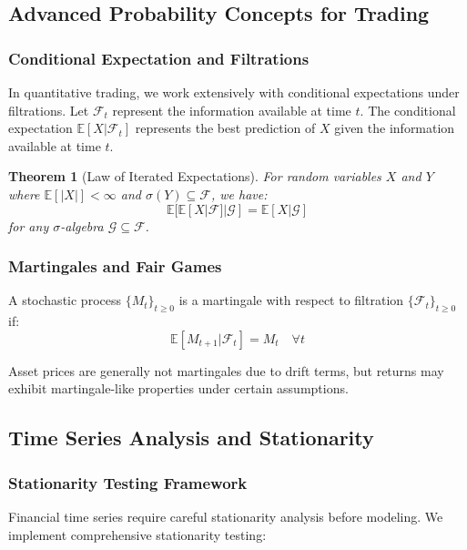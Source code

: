 \documentclass[11pt,letterpaper,openany]{book}
\newtheorem{theorem}{Theorem}[chapter]
\begin{document}
\subsection{Advanced Probability Concepts for Trading}

\subsubsection{Conditional Expectation and Filtrations}

In quantitative trading, we work extensively with conditional expectations under filtrations. Let $\mathcal{F}_t$ represent the information available at time $t$. The conditional expectation $\mathbb{E}[X|\mathcal{F}_t]$ represents the best prediction of $X$ given the information available at time $t$.

\begin{theorem}[Law of Iterated Expectations]
For random variables $X$ and $Y$ where $\mathbb{E}[|X|] < \infty$ and $\sigma(Y) \subseteq \mathcal{F}$, we have:
\[
\mathbb{E}[\mathbb{E}[X|\mathcal{F}] | \mathcal{G}] = \mathbb{E}[X | \mathcal{G}]
\]
for any $\sigma$-algebra $\mathcal{G} \subseteq \mathcal{F}$.
\end{theorem}

\subsubsection{Martingales and Fair Games}

A stochastic process $\{M_t\}_{t \geq 0}$ is a martingale with respect to filtration $\{\mathcal{F}_t\}_{t \geq 0}$ if:
\[
\mathbb{E}[M_{t+1} | \mathcal{F}_t] = M_t \quad \forall t
\]

Asset prices are generally not martingales due to drift terms, but returns may exhibit martingale-like properties under certain assumptions.

\subsection{Time Series Analysis and Stationarity}

\subsubsection{Stationarity Testing Framework}

Financial time series require careful stationarity analysis before modeling. We implement comprehensive stationarity testing:
\end{document}
